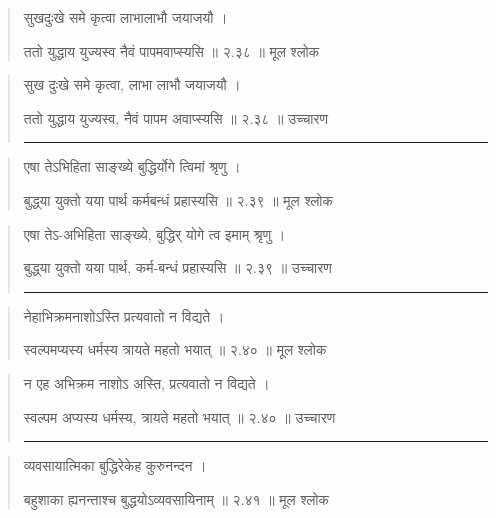 \begin{quotation}

सुखदुःखे समे कृत्वा लाभालाभौ जयाजयौ  ।  

ततो युद्धाय युज्यस्व नैवं पापमवाप्स्यसि  ॥ २.३८ ॥  मूल श्लोक
\end{quotation}

\begin{quotation}

सुख दुःखे समे कृत्वा, लाभा लाभौ जयाजयौ  ।  

ततो युद्धाय युज्यस्व, नैवं पापम अवाप्स्यसि  ॥ २.३८ ॥  उच्चारण

\noindent\rule{16cm}{0.4pt} 
\end{quotation}


\begin{quotation}

एषा तेऽभिहिता साङ्‍ख्ये बुद्धिर्योगे त्विमां श्रृणु  ।  

बुद्ध्‌या युक्तो यया पार्थ कर्मबन्धं प्रहास्यसि  ॥ २.३९ ॥  मूल श्लोक
\end{quotation}

\begin{quotation}

एषा तेऽ-अभिहिता साङ्‍ख्ये, बुद्धिर् योगे त्व इमाम् श्रृणु  ।  

बुद्ध्‌या युक्तो यया पार्थ, कर्म-बन्धं प्रहास्यसि  ॥ २.३९ ॥  उच्चारण

\noindent\rule{16cm}{0.4pt} 
\end{quotation}


\begin{quotation}
नेहाभिक्रमनाशोऽस्ति प्रत्यवातो न विद्यते  ।  

स्वल्पमप्यस्य धर्मस्य त्रायते महतो भयात्‌  ॥ २.४० ॥  मूल श्लोक
\end{quotation}

\begin{quotation}

न एह अभिक्रम नाशोऽ अस्ति, प्रत्यवातो न विद्यते  ।  

स्वल्पम अप्यस्य धर्मस्य, त्रायते महतो भयात्‌  ॥ २.४० ॥  उच्चारण

\noindent\rule{16cm}{0.4pt} 
\end{quotation}


\begin{quotation}

व्यवसायात्मिका बुद्धिरेकेह कुरुनन्दन  ।  

बहुशाका ह्यनन्ताश्च बुद्धयोऽव्यवसायिनाम्‌  ॥ २.४१ ॥  मूल श्लोक
\end{quotation}

